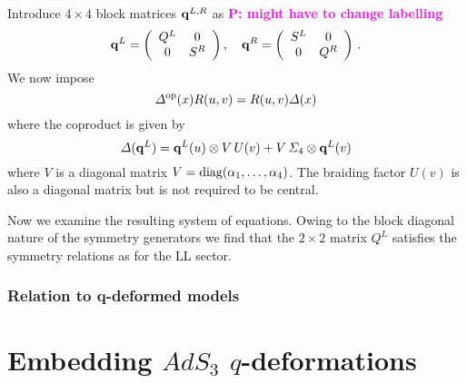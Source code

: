 \documentclass[12pt,a4paper]{article}
\numberwithin{equation}{section}
\newcommand{\comP}[1]{{\bf\textcolor{magenta} {P:} \textcolor{magenta}{#1}}}
\begin{document}
Introduce $4\times 4$ block matrices ${\bf q}^{L,R}$ as \comP{might have to change labelling}
\begin{equation}
{\bf q}^L=\left(\begin{array}{cc}
Q^L & 0 \\
0 & S^R
\end{array}\right),\quad {\bf q}^R=\left(\begin{array}{cc}
S^L & 0 \\
0 & Q^R
\end{array}\right)\,.
\end{equation}
We now impose 
\begin{equation}
\Delta^{\rm op}(x)R(u,v) = R(u,v)\Delta(x)
\end{equation}
where the coproduct is given by 
\begin{equation}
\Delta({\bf q}^L) = {\bf q}^L(u)\otimes V\,U(v) + V\,\Sigma_4 \otimes {\bf q}^L(v)
\end{equation}
where $V$ is a diagonal matrix $V={\rm diag}(\alpha_1,\dots,\alpha_4)$. The braiding factor $U(v)$ is also a diagonal matrix but is not required to be central. 

\medskip

Now we examine the resulting system of equations. Owing to the block diagonal nature of the symmetry generators we find that the $2\times 2$ matrix $Q^L$ satisfies the symmetry relations as for the LL sector. 

\subsubsection*{Relation to q-deformed models}

\cite{Bocconcello:2020qkt,Seibold:2021lju}

\fi

\iffalse
\section{Embedding $ AdS_{3} $ $ q $-deformations}
\end{document}
